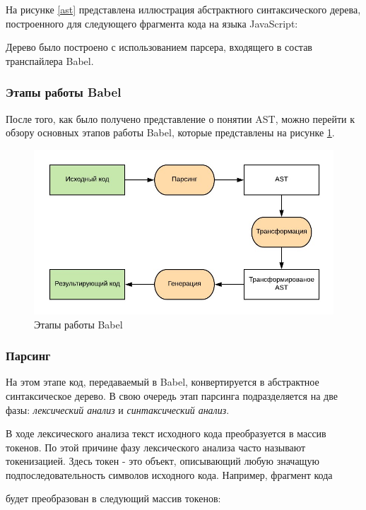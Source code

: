 \documentclass[14pt, a4paper]{article}
\begin{document}
На рисунке \ref{ast} представлена иллюстрация абстрактного синтаксического дерева, построенного для
следующего фрагмента кода на языка JavaScript:



Дерево было построено с использованием парсера, входящего в состав транспайлера Babel.

\subsubsection{Этапы работы Babel}

После того, как было получено представление о понятии AST, можно перейти к обзору основных этапов
работы Babel, которые представлены на рисунке \ref{babel_stages}.
\begin{figure}[h!]
  \centering
  \includegraphics[scale=1.2]{img/babel_stages.jpg}
  \caption{Этапы работы Babel}
  \label{babel_stages}
\end{figure}

\subsubsection*{Парсинг}
На этом этапе код, передаваемый в Babel, конвертируется в абстрактное синтаксическое дерево.
В свою очередь этап парсинга подразделяется на
две фазы: \textit{лексический анализ} и \textit{синтаксический анализ}.

В ходе лексического анализа текст исходного кода преобразуется в массив токенов. По этой причине фазу
лексического анализа часто называют токенизацией. Здесь токен - это объект, описывающий любую значащую
подпоследовательность символов исходного кода. Например, фрагмент кода

будет преобразован в следующий массив токенов:
\end{document}
